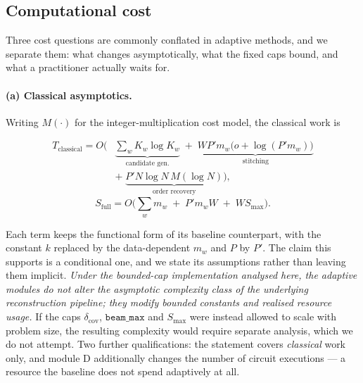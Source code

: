 \documentclass[preprint,11pt]{elsarticle}
\newcommand{\dcov}{\delta_{\mathrm{cov}}}
\newcommand{\Smax}{S_{\max}}
\newcommand{\beammax}{\texttt{beam\_max}}
\begin{document}
\subsection{Computational cost}
\label{sec:cost}

Three cost questions are commonly conflated in adaptive methods, and we
separate them: what changes asymptotically, what the fixed caps bound,
and what a practitioner actually waits for.

\paragraph{(a) Classical asymptotics.} Writing $M(\cdot)$ for the
integer-multiplication cost model, the classical work is

\begin{equation}
\begin{split}
T_{\text{classical}} = O\Big(
&\underbrace{\textstyle\sum_w K_w\log K_w}_{\text{candidate gen.}} \;+\;
\underbrace{W P' m_w\big(o+\log(P'm_w)\big)}_{\text{stitching}} \\[2pt]
&+\;\underbrace{P' N\log N\, M(\log N)}_{\text{order recovery}}
\Big),
\end{split}
\label{eq:cost}
\end{equation}
\begin{equation}
S_{\text{full}} = O\!\Big(\textstyle\sum_w m_w \;+\; P' m_w W \;+\; W \Smax\Big).
\label{eq:space}
\end{equation}

Each term keeps the functional form of its baseline counterpart, with the
constant $k$ replaced by the data-dependent $m_w$ and $P$ by $P'$. The
claim this supports is a conditional one, and we state its assumptions
rather than leaving them implicit. \emph{Under the bounded-cap
implementation analysed here, the adaptive modules do not alter the
asymptotic complexity class of the underlying reconstruction pipeline;
they modify bounded constants and realised resource usage.} If the caps
$\dcov$, $\beammax$ and $\Smax$ were instead allowed to scale with
problem size, the resulting complexity would require separate analysis,
which we do not attempt. Two further qualifications: the statement covers
\emph{classical} work only, and module D additionally changes the number
of circuit executions --- a resource the baseline does not spend
adaptively at all.
\end{document}
